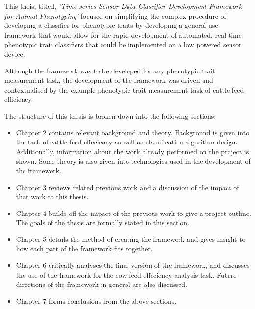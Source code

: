 This theis, titled, \textit{'Time-series Sensor Data Classifier Development Framework for Animal Phenotyping'} focused on simplifying the complex procedure of developing a classifier for phenotypic traits by developing a general use framework that would allow for the rapid development of automated, real-time phenotypic trait classifiers that could be implemented on a low powered sensor device. 

Although the framework was to be developed for any phenotypic trait measurement task, the development of the framework was driven and contextualised by the example phenotypic trait measurement task of cattle feed efficiency.

The structure of this thesis is broken down into the following sections:

\begin{itemize}

\item Chapter 2 contains relevant background and theory. Background is given into the task of cattle feed effeciency as well as classification algorithm design. Additionally, information about the work already performed on the project is shown. Some theory is also given into technologies used in the development of the framework. 

\item Chapter 3 reviews related previous work and a discussion of the impact of that work to this thesis.

\item Chapter 4 builds off the impact of the previous work to give a project outline. The goals of the thesis are formally stated in this section.

\item Chapter 5 details the method of creating the framework and gives insight to how each part of the framework fits together. 

\item Chapter 6 critically analyses the final version of the framework, and discusses the use of the framework for the cow feed effeciency analysis task. Future directions of the framework in general are also discussed.

\item Chapter 7 forms conclusions from the above sections.

\end{itemize}